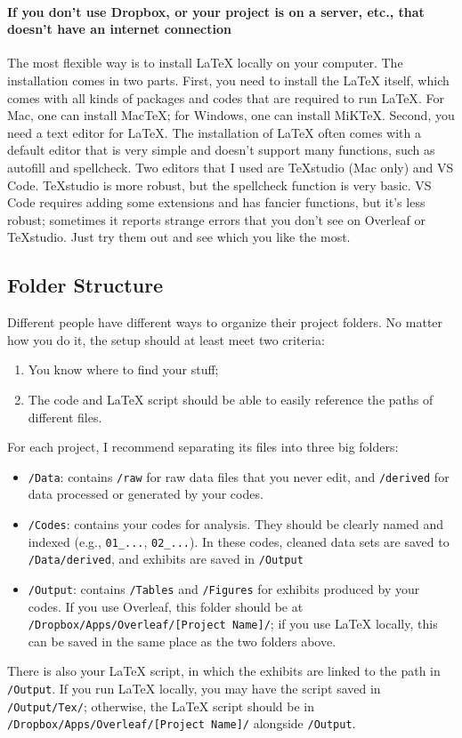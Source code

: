 \paragraph{If you don't use Dropbox, or your project is on a server, etc., that doesn't have an internet connection}
The most flexible way is to install {\LaTeX} locally on your computer. The installation comes in two parts. First, you need to install the {\LaTeX} itself, which comes with all kinds of packages and codes that are required to run {\LaTeX}. For Mac, one can install MacTeX; for Windows, one can install MiKTeX. Second, you need a text editor for {\LaTeX}. The installation of {\LaTeX} often comes with a default editor that is very simple and doesn't support many functions, such as autofill and spellcheck. Two editors that I used are TeXstudio (Mac only) and VS Code. TeXstudio is more robust, but the spellcheck function is very basic. VS Code requires adding some extensions and has fancier functions, but it's less robust; sometimes it reports strange errors that you don't see on Overleaf or TeXstudio. Just try them out and see which you like the most. 

\subsection{Folder Structure}
Different people have different ways to organize their project folders. No matter how you do it, the setup should at least meet two criteria:
\begin{enumerate}
    \item You know where to find your stuff;
    \item The code and {\LaTeX} script should be able to easily reference the paths of different files.
\end{enumerate}
For each project, I recommend separating its files into three big folders: 
\begin{itemize}
    \item \verb|/Data|: contains \verb|/raw| for raw data files that you never edit, and \verb|/derived| for data processed or generated by your codes. 
    \item \verb|/Codes|: contains your codes for analysis. They should be clearly named and indexed (e.g., \verb|01_...|, \verb|02_...|). In these codes, cleaned data sets are saved to \verb|/Data/derived|, and exhibits are saved in \verb|/Output|
    \item \verb|/Output|: contains \verb|/Tables| and \verb|/Figures| for exhibits produced by your codes. If you use Overleaf, this folder should be at \verb|/Dropbox/Apps/Overleaf/[Project Name]/|; if you use {\LaTeX} locally, this can be saved in the same place as the two folders above. 
\end{itemize}
There is also your {\LaTeX} script, in which the exhibits are linked to the path in \verb|/Output|. If you run {\LaTeX} locally, you may have the script saved in \verb|/Output/Tex/|; otherwise, the {\LaTeX} script should be in \verb|/Dropbox/Apps/Overleaf/[Project Name]/| alongside \verb|/Output|. 

